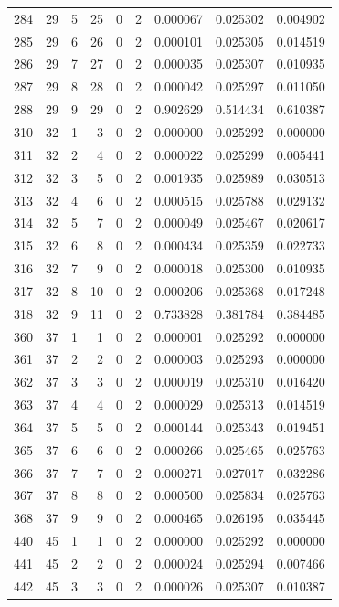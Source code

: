 \begin{longtable}{rrrrrrrrr}
284 & 29 & 5 & 25 & 0 & 2 & 0.000067 & 0.025302 & 0.004902 \\
285 & 29 & 6 & 26 & 0 & 2 & 0.000101 & 0.025305 & 0.014519 \\
286 & 29 & 7 & 27 & 0 & 2 & 0.000035 & 0.025307 & 0.010935 \\
287 & 29 & 8 & 28 & 0 & 2 & 0.000042 & 0.025297 & 0.011050 \\
288 & 29 & 9 & 29 & 0 & 2 & 0.902629 & 0.514434 & 0.610387 \\
310 & 32 & 1 & 3 & 0 & 2 & 0.000000 & 0.025292 & 0.000000 \\
311 & 32 & 2 & 4 & 0 & 2 & 0.000022 & 0.025299 & 0.005441 \\
312 & 32 & 3 & 5 & 0 & 2 & 0.001935 & 0.025989 & 0.030513 \\
313 & 32 & 4 & 6 & 0 & 2 & 0.000515 & 0.025788 & 0.029132 \\
314 & 32 & 5 & 7 & 0 & 2 & 0.000049 & 0.025467 & 0.020617 \\
315 & 32 & 6 & 8 & 0 & 2 & 0.000434 & 0.025359 & 0.022733 \\
316 & 32 & 7 & 9 & 0 & 2 & 0.000018 & 0.025300 & 0.010935 \\
317 & 32 & 8 & 10 & 0 & 2 & 0.000206 & 0.025368 & 0.017248 \\
318 & 32 & 9 & 11 & 0 & 2 & 0.733828 & 0.381784 & 0.384485 \\
360 & 37 & 1 & 1 & 0 & 2 & 0.000001 & 0.025292 & 0.000000 \\
361 & 37 & 2 & 2 & 0 & 2 & 0.000003 & 0.025293 & 0.000000 \\
362 & 37 & 3 & 3 & 0 & 2 & 0.000019 & 0.025310 & 0.016420 \\
363 & 37 & 4 & 4 & 0 & 2 & 0.000029 & 0.025313 & 0.014519 \\
364 & 37 & 5 & 5 & 0 & 2 & 0.000144 & 0.025343 & 0.019451 \\
365 & 37 & 6 & 6 & 0 & 2 & 0.000266 & 0.025465 & 0.025763 \\
366 & 37 & 7 & 7 & 0 & 2 & 0.000271 & 0.027017 & 0.032286 \\
367 & 37 & 8 & 8 & 0 & 2 & 0.000500 & 0.025834 & 0.025763 \\
368 & 37 & 9 & 9 & 0 & 2 & 0.000465 & 0.026195 & 0.035445 \\
440 & 45 & 1 & 1 & 0 & 2 & 0.000000 & 0.025292 & 0.000000 \\
441 & 45 & 2 & 2 & 0 & 2 & 0.000024 & 0.025294 & 0.007466 \\
442 & 45 & 3 & 3 & 0 & 2 & 0.000026 & 0.025307 & 0.010387 \\

\end{longtable}
